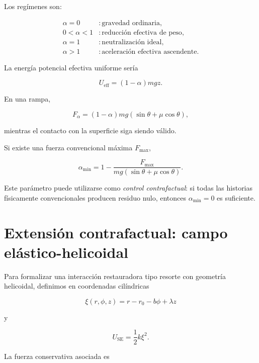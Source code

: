 Los regímenes son:

\begin{align}
\alpha=0 &: \text{gravedad ordinaria},\\
0<\alpha<1 &: \text{reducción efectiva de peso},\\
\alpha=1 &: \text{neutralización ideal},\\
\alpha>1 &: \text{aceleración efectiva ascendente}.
\end{align}

La energía potencial efectiva uniforme sería

\begin{equation}
U_{\mathrm{eff}}
=
(1-\alpha)mgz.
\end{equation}

En una rampa,

\begin{equation}
F_\alpha
=
(1-\alpha)mg
(\sin\theta+\mu\cos\theta),
\end{equation}

mientras el contacto con la superficie siga siendo válido.

Si existe una fuerza convencional máxima \(F_{\max}\),

\begin{equation}
\boxed{
\alpha_{\min}
=
1-
\frac{
F_{\max}
}{
mg(\sin\theta+\mu\cos\theta)
}.
}
\end{equation}

Este parámetro puede utilizarse como \emph{control contrafactual}: si todas las historias físicamente convencionales producen residuo nulo, entonces \(\alpha_{\min}=0\) es suficiente.

\section{Extensión contrafactual: campo elástico-helicoidal}

Para formalizar una interacción restauradora tipo resorte con geometría helicoidal, definimos en coordenadas cilíndricas

\begin{equation}
\xi(r,\phi,z)
=
r-r_0-b\phi+\lambda z
\end{equation}

y

\begin{equation}
U_{\mathrm{SE}}
=
\frac12k\xi^2.
\end{equation}

La fuerza conservativa asociada es

